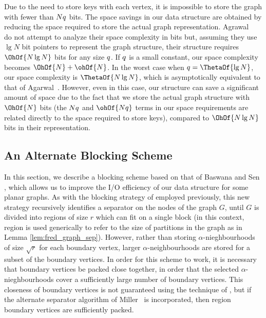 {Due to the need to store keys with each vertex, it is impossible to
store the graph with fewer than $Nq$ bits.  The space savings in our
data structure are obtained by reducing the space required to store
the actual graph representation.
Agrawal~\etal~\cite{DBLP:conf/soda/AgarwalAMVV98} do not attempt to
analyze their space complexity in bits but, assuming they use
$\lg{N}$ bit pointers to represent the graph structure, their
structure requires $\OhOf{N \lg{N}}$ bits for any size $q$. 
If $q$ is
a small constant, our space complexity becomes $\OhOf{N} +
\ohOf{N}$.
In the worst case when $\bitsPerKey = \ThetaOf{\lg N}$, our 
space complexity is $\ThetaOf{N \lg N}$, which is asymptotically 
equivalent to that of Agarwal~\etal.
However, even in this case, our structure can save a significant amount
of space due to the fact that we store the actual graph structure with
$\OhOf{N}$ bits (the $N q$ and $\ohOf{N\bitsPerKey}$ terms
in our space requirements are related directly to the space
required to store keys), compared to $\OhOf{N \lg N}$ bits in their
representation.

\subsection{An Alternate Blocking Scheme}\label{sec:alt_block_scheme}

In this section, we describe a blocking scheme based on that
of Baswana and Sen \cite{DBLP:journals/algorithmica/BaswanaS02}, which
allows us to improve the I/O efficiency of our data structure for some
planar graphs. 
As with the blocking strategy of
\cite{DBLP:conf/soda/AgarwalAMVV98} employed previously, this new
strategy recursively identifies a separator on the nodes of the graph
$G$, until $G$ is divided into regions of size $r$ which can fit on a
single block (in this context, region is used generically to refer to
the size of partitions in the graph as in Lemma
\ref{lem:fred_graph_sep}). However, rather than storing
$\alpha$-nieghbourhoods of size $\sqrt{r}$ for each boundary vertex,
larger $\alpha$-neighbourhoods are stored for a subset of the boundary
vertices. 
In order for this scheme to work, it is necessary that
boundary vertices be packed close together, in order that the selected
$\alpha$-nieghbourhoods cover a sufficiently large number of boundary
vertices. This closeness of boundary vertices is not guaranteed using
the technique of \cite{DBLP:conf/soda/AgarwalAMVV98}, but if the
alternate separator algorithm of Miller~\cite{miller_1986} is
incorporated, then region boundary vertices are sufficiently packed.

}
